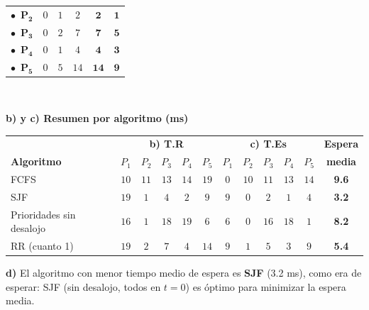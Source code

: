 \documentclass[10pt, a4paper]{article}
\begin{document}
\begin{minipage}{\linewidth}
\begin{minipage}[t]{0.275\linewidth}
\begin{tabular}{lccccc}
\textcolor{col1}{$\bullet$}\ \textcolor{col1}{$\mathbf{P_{2}}$} & $0$ & $1$ & $2$ & \textcolor{tr}{$\boldsymbol{2}$} & \textcolor{es}{$\boldsymbol{1}$} \\
\textcolor{col2}{$\bullet$}\ \textcolor{col2}{$\mathbf{P_{3}}$} & $0$ & $2$ & $7$ & \textcolor{tr}{$\boldsymbol{7}$} & \textcolor{es}{$\boldsymbol{5}$} \\
\textcolor{col3}{$\bullet$}\ \textcolor{col3}{$\mathbf{P_{4}}$} & $0$ & $1$ & $4$ & \textcolor{tr}{$\boldsymbol{4}$} & \textcolor{es}{$\boldsymbol{3}$} \\
\textcolor{col4}{$\bullet$}\ \textcolor{col4}{$\mathbf{P_{5}}$} & $0$ & $5$ & $14$ & \textcolor{tr}{$\boldsymbol{14}$} & \textcolor{es}{$\boldsymbol{9}$} \\
\bottomrule\end{tabular}\\[5pt]
\hspace{2mm}
\end{minipage}
\end{minipage}
\par\vspace{0.35cm}
\begin{minipage}{\linewidth}\small\noindent\textbf{b) y c) Resumen por algoritmo (ms)}\par\vspace{3pt}\centering\setlength{\tabcolsep}{5pt}\renewcommand{\arraystretch}{1.15}
\begin{tabular}{l|ccccc|ccccc|c}\toprule
 & \multicolumn{5}{c|}{\textbf{b)  T.R}} & \multicolumn{5}{c|}{\textbf{c)  T.Es}} & \textbf{Espera} \\
\textbf{Algoritmo} & $P_1$ & $P_2$ & $P_3$ & $P_4$ & $P_5$ & $P_1$ & $P_2$ & $P_3$ & $P_4$ & $P_5$ & \textbf{media} \\ \midrule
FCFS & $10$ & $11$ & $13$ & $14$ & $19$ & $0$ & $10$ & $11$ & $13$ & $14$ & \textbf{9.6} \\
SJF & $19$ & $1$ & $4$ & $2$ & $9$ & $9$ & $0$ & $2$ & $1$ & $4$ & \textbf{3.2} \\
Prioridades sin desalojo & $16$ & $1$ & $18$ & $19$ & $6$ & $6$ & $0$ & $16$ & $18$ & $1$ & \textbf{8.2} \\
RR (cuanto 1) & $19$ & $2$ & $7$ & $4$ & $14$ & $9$ & $1$ & $5$ & $3$ & $9$ & \textbf{5.4} \\
\bottomrule\end{tabular}\par\vspace{6pt}\raggedright
\textbf{d)} El algoritmo con menor tiempo medio de espera es \textbf{SJF} (3.2 ms), como era de esperar: SJF (sin desalojo, todos en $t=0$) es óptimo para minimizar la espera media.
\end{minipage}
\end{document}
